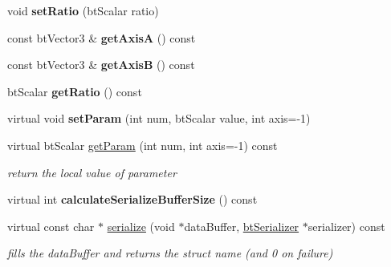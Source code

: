 \begin{DoxyCompactItemize}
\item 
\mbox{\label{classbtGearConstraint_a77e0470a164f0fb52aba7fc1fa6aae9e}} 
void {\bfseries set\+Ratio} (bt\+Scalar ratio)
\item 
\mbox{\label{classbtGearConstraint_a6b2e52133e6c014ef941ac058583a38b}} 
const bt\+Vector3 \& {\bfseries get\+AxisA} () const
\item 
\mbox{\label{classbtGearConstraint_acc8047ff8a806ed857bf8ebdeaa790a1}} 
const bt\+Vector3 \& {\bfseries get\+AxisB} () const
\item 
\mbox{\label{classbtGearConstraint_aff98bc6ffbe12a3095be1a7d3e2afa67}} 
bt\+Scalar {\bfseries get\+Ratio} () const
\item 
\mbox{\label{classbtGearConstraint_a5fb040e6b923ec5d4a735cf0953a421a}} 
virtual void {\bfseries set\+Param} (int num, bt\+Scalar value, int axis=-\/1)
\item 
\mbox{\label{classbtGearConstraint_a522a5cd09cecc3ffae11e24019f07178}} 
virtual bt\+Scalar \hyperlink{classbtGearConstraint_a522a5cd09cecc3ffae11e24019f07178}{get\+Param} (int num, int axis=-\/1) const
\begin{DoxyCompactList}\small\item\em return the local value of parameter \end{DoxyCompactList}\item 
\mbox{\label{classbtGearConstraint_a53c38e37c91252f2444e9634a01a74f2}} 
virtual int {\bfseries calculate\+Serialize\+Buffer\+Size} () const
\item 
\mbox{\label{classbtGearConstraint_a11f076cf98d52f8219a6c6962fd69fed}} 
virtual const char $\ast$ \hyperlink{classbtGearConstraint_a11f076cf98d52f8219a6c6962fd69fed}{serialize} (void $\ast$data\+Buffer, \hyperlink{classbtSerializer}{bt\+Serializer} $\ast$serializer) const
\begin{DoxyCompactList}\small\item\em fills the data\+Buffer and returns the struct name (and 0 on failure) \end{DoxyCompactList}\item 

\end{DoxyCompactItemize}
